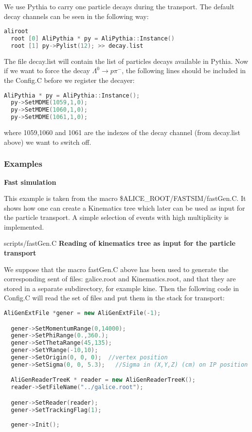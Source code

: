 \documentclass[12pt,a4paper,twoside]{article}
\begin{document}
We use Pythia to carry one particle decays during the transport. The
default decay channels can be seen in the following way:

\begin{lstlisting}[language=C++]
  aliroot
  root [0] AliPythia * py = AliPythia::Instance()
  root [1] py->Pylist(12); >> decay.list
\end{lstlisting}

The file decay.list will contain the list of particles decays
available in Pythia. Now if we want to force the decay $\Lambda^0 \to
p \pi^-$, the following lines should be included in the Config.C
before we register the decayer:

\begin{lstlisting}[language=C++]
  AliPythia * py = AliPythia::Instance();
  py->SetMDME(1059,1,0);
  py->SetMDME(1060,1,0);
  py->SetMDME(1061,1,0);
\end{lstlisting}

where 1059,1060 and 1061 are the indexes of the decay channel (from
decay.list above) we want to switch off.

\subsubsection{Examples}

\noindent
\textbf{Fast simulation}

This example is taken from the macro
\$ALICE\_ROOT/FASTSIM/fastGen.C. It shows how one can create a
Kinematics tree which later can be used as input for the particle
transport. A simple selection of events with high multiplicity is
implemented. 

 {scripts/fastGen.C}
\noindent
\textbf{Reading of kinematics tree as input for the particle transport}

We suppose that the macro fastGen.C above has been used to generate
the corresponding sent of files: galice.root and Kinematics.root, and
that they are stored in a separate subdirectory, for example kine. Then
the following code in Config.C will read the set of files and put them
in the stack for transport:

\begin{lstlisting}[language=C++]
  AliGenExtFile *gener = new AliGenExtFile(-1);

  gener->SetMomentumRange(0,14000);
  gener->SetPhiRange(0.,360.);
  gener->SetThetaRange(45,135);
  gener->SetYRange(-10,10);
  gener->SetOrigin(0, 0, 0);  //vertex position
  gener->SetSigma(0, 0, 5.3);   //Sigma in (X,Y,Z) (cm) on IP position

  AliGenReaderTreeK * reader = new AliGenReaderTreeK();
  reader->SetFileName("../galice.root");

  gener->SetReader(reader);
  gener->SetTrackingFlag(1);
  
  gener->Init();
\end{lstlisting}
\end{document}
